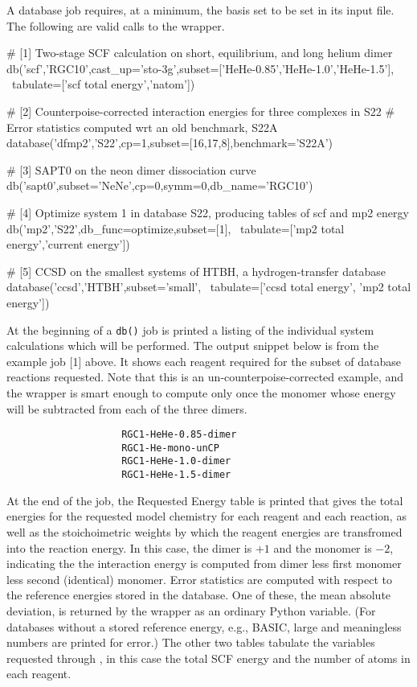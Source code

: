 A database job requires, at a minimum, the basis set to be set in its input file. The following are valid calls to the wrapper.
\begin{Snippet}
# [1] Two-stage SCF calculation on short, equilibrium, and long helium dimer
db('scf','RGC10',cast_up='sto-3g',subset=['HeHe-0.85','HeHe-1.0','HeHe-1.5'], \
  tabulate=['scf total energy','natom'])

# [2] Counterpoise-corrected interaction energies for three complexes in S22
#     Error statistics computed wrt an old benchmark, S22A
database('dfmp2','S22',cp=1,subset=[16,17,8],benchmark='S22A')

# [3] SAPT0 on the neon dimer dissociation curve
db('sapt0',subset='NeNe',cp=0,symm=0,db_name='RGC10')

# [4] Optimize system 1 in database S22, producing tables of scf and mp2 energy
db('mp2','S22',db_func=optimize,subset=[1], \
  tabulate=['mp2 total energy','current energy'])

# [5] CCSD on the smallest systems of HTBH, a hydrogen-transfer database
database('ccsd','HTBH',subset='small', \
  tabulate=['ccsd total energy', 'mp2 total energy'])
\end{Snippet}

\hiddensubsubsection{Output}

At the beginning of a \texttt{db()} job is printed a listing of the individual system 
calculations which will be performed. The output snippet below is from the example job [1]
above. It shows each reagent required for the subset of database reactions requested.
Note that this is an un-counterpoise-corrected example, and the wrapper is smart enough
to compute only once the monomer whose energy will be subtracted from each of the three dimers.
\begin{verbatim}
                    RGC1-HeHe-0.85-dimer
                    RGC1-He-mono-unCP
                    RGC1-HeHe-1.0-dimer
                    RGC1-HeHe-1.5-dimer
\end{verbatim}

At the end of the job, the Requested Energy table is printed that gives the total
energies for the requested model chemistry for each reagent and each reaction, as
well as the stoichoimetric weights by which the reagent energies are transfromed
into the reaction energy. In this case, the dimer is $+1$ and the monomer is $-2$,
indicating the the interaction energy is computed from dimer less first monomer
less second (identical) monomer. Error statistics are computed with respect to the reference
energies stored in the database. One of these, the mean absolute deviation, is 
returned by the wrapper as an ordinary Python variable. (For databases
without a stored reference energy, e.g., BASIC, large and meaningless numbers are
printed for error.) The other two tables tabulate the \PSI variables requested
through \pyoptionname{tabulate}, in this case the total SCF energy and the number
of atoms in each reagent.

